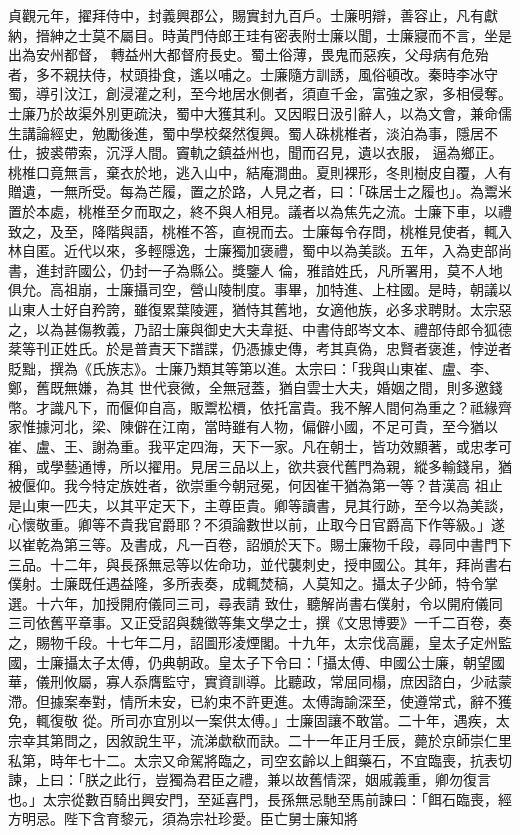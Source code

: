 \begin{pinyinscope}
 貞觀元年，擢拜侍中，封義興郡公，賜實封九百戶。士廉明辯，善容止，凡有獻納，搢紳之士莫不屬目。時黃門侍郎王珪有密表附士廉以聞，士廉寢而不言，坐是出為安州都督，
 轉益州大都督府長史。蜀土俗薄，畏鬼而惡疾，父母病有危殆者，多不親扶侍，杖頭掛食，遙以哺之。士廉隨方訓誘，風俗頓改。秦時李冰守蜀，導引汶江，創浸灌之利，至今地居水側者，須直千金，富強之家，多相侵奪。士廉乃於故渠外別更疏決，蜀中大獲其利。又因暇日汲引辭人，以為文會，兼命儒生講論經史，勉勵後進，蜀中學校粲然復興。蜀人硃桃椎者，淡泊為事，隱居不仕，披裘帶索，沉浮人間。竇軌之鎮益州也，聞而召見，遺以衣服，
 逼為鄉正。桃椎口竟無言，棄衣於地，逃入山中，結庵澗曲。夏則裸形，冬則樹皮自覆，人有贈遺，一無所受。每為芒履，置之於路，人見之者，曰：「硃居士之履也」。為鬻米置於本處，桃椎至夕而取之，終不與人相見。議者以為焦先之流。士廉下車，以禮致之，及至，降階與語，桃椎不答，直視而去。士廉每令存問，桃椎見使者，輒入林自匿。近代以來，多輕隱逸，士廉獨加褒禮，蜀中以為美談。五年，入為吏部尚書，進封許國公，仍封一子為縣公。獎鑒人
 倫，雅諳姓氏，凡所署用，莫不人地俱允。高祖崩，士廉攝司空，營山陵制度。事畢，加特進、上柱國。是時，朝議以山東人士好自矜誇，雖復累葉陵遲，猶恃其舊地，女適他族，必多求聘財。太宗惡之，以為甚傷教義，乃詔士廉與御史大夫韋挺、中書侍郎岑文本、禮部侍郎令狐德棻等刊正姓氏。於是普責天下譜諜，仍憑據史傳，考其真偽，忠賢者褒進，悖逆者貶黜，撰為《氏族志》。士廉乃類其等第以進。太宗曰：「我與山東崔、盧、李、鄭，舊既無嫌，為其
 世代衰微，全無冠蓋，猶自雲士大夫，婚姻之間，則多邀錢幣。才識凡下，而偃仰自高，販鬻松檟，依托富貴。我不解人間何為重之？祗緣齊家惟據河北，梁、陳僻在江南，當時雖有人物，偏僻小國，不足可貴，至今猶以崔、盧、王、謝為重。我平定四海，天下一家。凡在朝士，皆功效顯著，或忠孝可稱，或學藝通博，所以擢用。見居三品以上，欲共衰代舊門為親，縱多輸錢帛，猶被偃仰。我今特定族姓者，欲崇重今朝冠冕，何因崔干猶為第一等？昔漢高
 祖止是山東一匹夫，以其平定天下，主尊臣貴。卿等讀書，見其行跡，至今以為美談，心懷敬重。卿等不貴我官爵耶？不須論數世以前，止取今日官爵高下作等級。」遂以崔乾為第三等。及書成，凡一百卷，詔頒於天下。賜士廉物千段，尋同中書門下三品。十二年，與長孫無忌等以佐命功，並代襲刺史，授申國公。其年，拜尚書右僕射。士廉既任遇益隆，多所表奏，成輒焚稿，人莫知之。攝太子少師，特令掌選。十六年，加授開府儀同三司，尋表請
 致仕，聽解尚書右僕射，令以開府儀同三司依舊平章事。又正受詔與魏徵等集文學之士，撰《文思博要》一千二百卷，奏之，賜物千段。十七年二月，詔圖形凌煙閣。十九年，太宗伐高麗，皇太子定州監國，士廉攝太子太傅，仍典朝政。皇太子下令曰：「攝太傅、申國公士廉，朝望國華，儀刑攸屬，寡人忝膺監守，實資訓導。比聽政，常屈同榻，庶因諮白，少祛蒙滯。但據案奉對，情所未安，已約束不許更進。太傅誨諭深至，使遵常式，辭不獲免，輒復敬
 從。所司亦宜別以一案供太傅。」士廉固讓不敢當。二十年，遇疾，太宗幸其第問之，因敘說生平，流涕歔欷而訣。二十一年正月壬辰，薨於京師崇仁里私第，時年七十二。太宗又命駕將臨之，司空玄齡以上餌藥石，不宜臨喪，抗表切諫，上曰：「朕之此行，豈獨為君臣之禮，兼以故舊情深，姻戚義重，卿勿復言也。」太宗從數百騎出興安門，至延喜門，長孫無忌馳至馬前諫曰：「餌石臨喪，經方明忌。陛下含育黎元，須為宗社珍愛。臣亡舅士廉知將

\end{pinyinscope}
